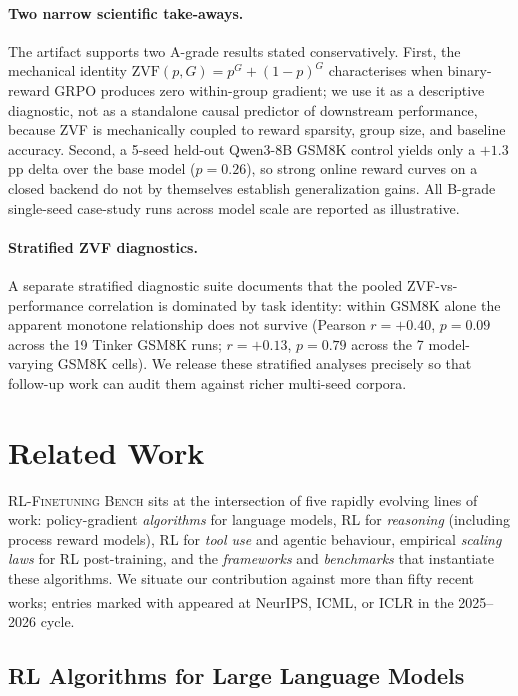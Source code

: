 \documentclass{article}
\newcommand{\ours}{\textsc{RL-Finetuning Bench}}
\begin{document}
\paragraph{Two narrow scientific take-aways.}
The artifact supports two A-grade results stated conservatively. First, the
mechanical identity $\mathrm{ZVF}(p, G) = p^{G} + (1{-}p)^{G}$ characterises
when binary-reward GRPO produces zero within-group gradient; we use it as
a descriptive diagnostic, not as a standalone causal predictor of
downstream performance, because ZVF is mechanically coupled to reward
sparsity, group size, and baseline accuracy. Second, a 5-seed held-out
Qwen3-8B GSM8K control yields only a $+1.3$pp delta over the base model
($p{=}0.26$), so strong online reward curves on a closed backend do not by
themselves establish generalization gains. All B-grade single-seed
case-study runs across model scale are reported as illustrative.

\paragraph{Stratified ZVF diagnostics.}
A separate stratified diagnostic suite documents that the pooled
ZVF-vs-performance correlation is dominated by task identity: within
GSM8K alone the apparent monotone relationship does not survive
(Pearson $r=+0.40$, $p=0.09$ across the 19 Tinker GSM8K runs;
$r=+0.13$, $p=0.79$ across the 7 model-varying GSM8K cells). We
release these stratified analyses precisely so that follow-up work can
audit them against richer multi-seed corpora.
 


\section{Related Work}
\label{sec:related}

\ours{} sits at the intersection of five rapidly evolving lines of work:
policy-gradient \emph{algorithms} for language models, RL for \emph{reasoning}
(including process reward models), RL for \emph{tool use} and agentic behaviour,
empirical \emph{scaling laws} for RL post-training, and the \emph{frameworks}
and \emph{benchmarks} that instantiate these algorithms. We situate our
contribution against more than fifty recent works; entries marked with
\textsuperscript{\dag} appeared at NeurIPS, ICML, or ICLR in the 2025--2026 cycle.

\subsection{RL Algorithms for Large Language Models}
\label{sec:related:algos}
\end{document}
